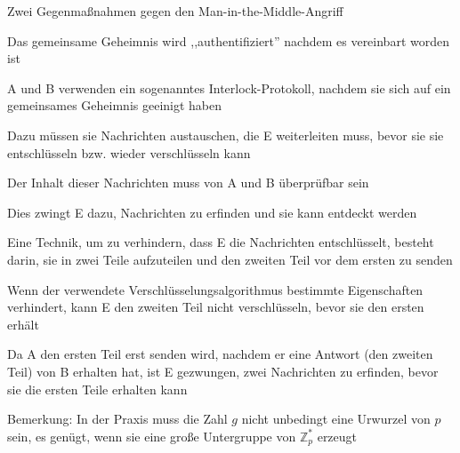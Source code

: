 \documentclass[a4paper]{article}
\begin{document}
\begin{multicols}{3}
\begin{itemize*}
\begin{itemize*}
            \end{itemize*}
            \item Zwei Gegenmaßnahmen gegen den Man-in-the-Middle-Angriff
            \begin{itemize*}
                  \item Das gemeinsame Geheimnis wird ,,authentifiziert'' nachdem es vereinbart worden ist
                  \item A und B verwenden ein sogenanntes Interlock-Protokoll, nachdem sie sich auf ein gemeinsames Geheimnis geeinigt haben
                  \item Dazu müssen sie Nachrichten austauschen, die E weiterleiten muss, bevor sie sie entschlüsseln bzw. wieder verschlüsseln kann
                  \item Der Inhalt dieser Nachrichten muss von A und B überprüfbar sein
                  \item Dies zwingt E dazu, Nachrichten zu erfinden und sie kann entdeckt werden
                  \item Eine Technik, um zu verhindern, dass E die Nachrichten entschlüsselt, besteht darin, sie in zwei Teile aufzuteilen und den zweiten Teil vor dem ersten zu senden
                  \item Wenn der verwendete Verschlüsselungsalgorithmus bestimmte Eigenschaften verhindert, kann E den zweiten Teil nicht verschlüsseln, bevor sie den ersten erhält
                  \item Da A den ersten Teil erst senden wird, nachdem er eine Antwort (den zweiten Teil) von B erhalten hat, ist E gezwungen, zwei Nachrichten zu erfinden, bevor sie die ersten Teile erhalten kann
            \end{itemize*}
            \item Bemerkung: In der Praxis muss die Zahl $g$ nicht unbedingt eine Urwurzel von $p$ sein, es genügt, wenn sie eine große Untergruppe von $\mathbb{Z}^*_p$ erzeugt
      \end{itemize*}


\end{multicols}
\end{document}
